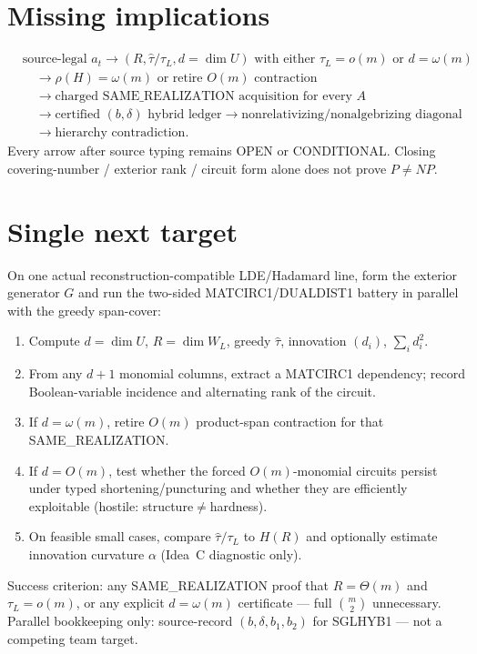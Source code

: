 \documentclass[11pt]{article}
\begin{document}
\section*{Missing implications}
\[
\begin{aligned}
&\text{source-legal }a_t
\to (R,\widehat\tau/\tau_L,d=\dim U)\text{ with either }\tau_L=o(m)\text{ or }d=\omega(m)\\
&\quad\to\rho(H)=\omega(m)\text{ or retire }O(m)\text{ contraction}\\
&\quad\to\text{charged SAME\_REALIZATION acquisition for every }A\\
&\quad\to\text{certified }(b,\delta)\text{ hybrid ledger}
\to\text{nonrelativizing/nonalgebrizing diagonal}\\
&\quad\to\text{hierarchy contradiction}.
\end{aligned}
\]
Every arrow after source typing remains OPEN or CONDITIONAL. Closing covering-number / exterior
rank / circuit form alone does not prove $P\neq NP$.

\section*{Single next target}
On one actual reconstruction-compatible LDE/Hadamard line, form the exterior generator $G$ and
run the two-sided MATCIRC1/DUALDIST1 battery in parallel with the greedy span-cover:
\begin{enumerate}
\item Compute $d=\dim U$, $R=\dim W_L$, greedy $\widehat\tau$, innovation $(d_i)$, $\sum_i d_i^2$.
\item From any $d+1$ monomial columns, extract a MATCIRC1 dependency; record Boolean-variable
incidence and alternating rank of the circuit.
\item If $d=\omega(m)$, retire $O(m)$ product-span contraction for that SAME\_REALIZATION.
\item If $d=O(m)$, test whether the forced $O(m)$-monomial circuits persist under typed
shortening/puncturing and whether they are efficiently exploitable (hostile: structure$\neq$hardness).
\item On feasible small cases, compare $\widehat\tau/\tau_L$ to $H(R)$ and optionally estimate
innovation curvature $\alpha$ (Idea~C diagnostic only).
\end{enumerate}
Success criterion: any SAME\_REALIZATION proof that $R=\Theta(m)$ and $\tau_L=o(m)$, or any
explicit $d=\omega(m)$ certificate --- full $\binom{m}{2}$ unnecessary.
Parallel bookkeeping only: source-record $(b,\delta,b_1,b_2)$ for SGLHYB1 --- not a competing
team target.
\end{document}
